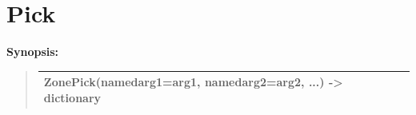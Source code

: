\documentclass[letterpaper,10pt,english]{sphinxmanual}
\begin{document}
\section{Pick}
\label{functions:pick}
\begin{DUlineblock}{0em}
\item[] \textbf{Synopsis:}
\end{DUlineblock}
\begin{quote}

\begin{tabulary}{\linewidth}{|L|}
\hline

ZonePick(namedarg1=arg1, namedarg2=arg2, ...) -\textgreater{} dictionary
\\
\hline\end{tabulary}

\end{quote}
\end{document}
